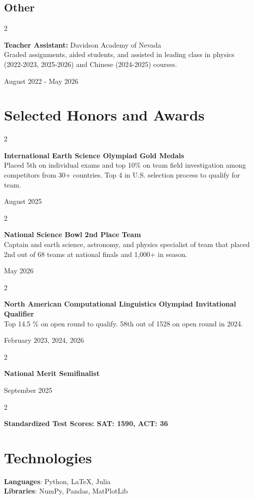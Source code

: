 \documentclass[10pt, letterpaper]{article}
\newenvironment{twocolentry}[2][]{
    \onecolentry
    \def\secondColumn{#2}
    \setcolumnwidth{\fill, 4.5 cm}
    \begin{paracol}{2}
}{
    \switchcolumn \raggedleft \secondColumn
    \end{paracol}
    \endonecolentry
} %
\begin{document}
    \subsection{Other}
    \begin{twocolentry}{
        August 2022 - May 2026
    }
        \textbf{Teacher Assistant:} Davidson Academy of Nevada \\
        Graded assignments, aided students, and assisted in leading class in physics (2022-2023, 2025-2026) and Chinese (2024-2025) courses.
    \end{twocolentry}
    
    \section{Selected Honors and Awards}
    \begin{twocolentry}{
        August 2025
    }
        \textbf{International Earth Science Olympiad Gold Medals} \\
        Placed 5th on individual exams and top 10\% on team field investigation among competitors from 30+ countries. Top 4 in U.S. selection process to qualify for team.
    \end{twocolentry}  

    \begin{twocolentry}{
        May 2026
    }
        \textbf{National Science Bowl 2nd Place Team} \\
        Captain and earth science, astronomy, and physics specialist of team that placed 2nd out of 68 teams at national finals and 1,000+ in season.
    \end{twocolentry}

    \begin{twocolentry}{
        February 2023, 2024, 2026
    }
        \textbf{North American Computational Linguistics Olympiad Invitational Qualifier} \\
        Top 14.5 \% on open round to qualify. 58th out of 1528 on open round in 2024.

    \end{twocolentry}

    \begin{twocolentry}{
        September 2025
    }
        \textbf{National Merit Semifinalist}
    \end{twocolentry}

    \begin{twocolentry}{}
    \textbf{Standardized Test Scores:  SAT: 1590, ACT: 36}
    \end{twocolentry}

    \section{Technologies}
    \textbf{Languages}: Python, \LaTeX, Julia \\
    \textbf{Libraries}: NumPy, Pandas, MatPlotLib
\end{document}
